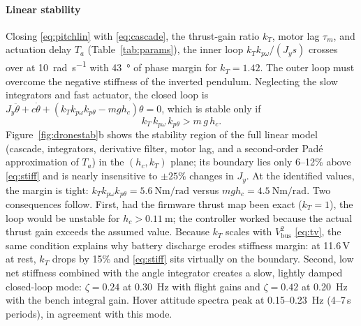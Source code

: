 \paragraph{Linear stability}
Closing \eqref{eq:pitchlin} with \eqref{eq:cascade}, the thrust-gain ratio $k_T$, motor lag $\tau_m$, and actuation delay $T_a$ (Table~\ref{tab:params}), the inner loop $k_Tk_{p\omega}/(J_ys)$ crosses over at \SI{10}{\radian\per\second} with \SI{43}{\degree} of phase margin for $k_T=1.42$. The outer loop must overcome the negative stiffness of the inverted pendulum. Neglecting the slow integrators and fast actuator, the closed loop is $J_y\ddot\theta+c\dot\theta+(k_Tk_{p\omega}k_{p\theta}-mgh_c)\theta=0$, which is stable only if
\begin{equation}
  k_T\,k_{p\omega}\,k_{p\theta}>m\,g\,h_c .
  \label{eq:stiff}
\end{equation}
Figure~\ref{fig:dronestab}b shows the stability region of the full linear model (cascade, integrators, derivative filter, motor lag, and a second-order Pad\'e approximation of $T_a$) in the $(h_c,k_T)$ plane; its boundary lies only 6--12\% above \eqref{eq:stiff} and is nearly insensitive to $\pm25\%$ changes in $J_y$. At the identified values, the margin is tight: $k_Tk_{p\omega}k_{p\theta}=\SI{5.6}{\newton\metre\per\radian}$ versus $mgh_c=\SI{4.5}{\newton\metre\per\radian}$. Two consequences follow. First, had the firmware thrust map been exact ($k_T=1$), the loop would be unstable for $h_c>\SI{0.11}{\metre}$; the controller worked because the actual thrust gain exceeds the assumed value. Because $k_T$ scales with $V_{\mathrm{bus}}^2$ \eqref{eq:tv}, the same condition explains why battery discharge erodes stiffness margin: at 11.6\,V at rest, $k_T$ drops by 15\% and \eqref{eq:stiff} sits virtually on the boundary. Second, low net stiffness combined with the angle integrator creates a slow, lightly damped closed-loop mode: $\zeta=0.24$ at \SI{0.30}{\hertz} with flight gains and $\zeta=0.42$ at \SI{0.20}{\hertz} with the bench integral gain. Hover attitude spectra peak at 0.15--\SI{0.23}{\hertz} (4--7\,s periods), in agreement with this mode.

